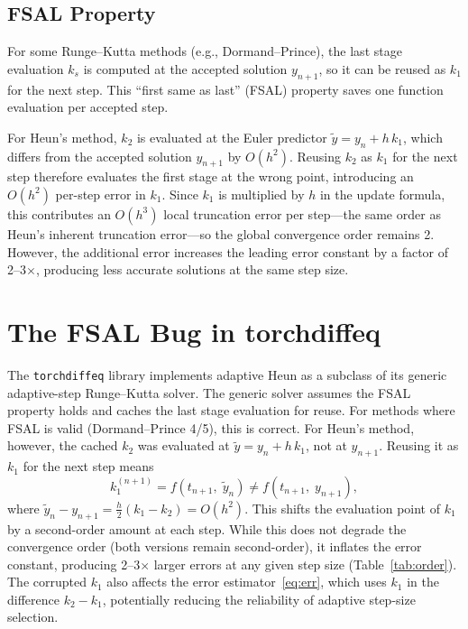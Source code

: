 \documentclass[11pt]{article}
\begin{document}
\subsection{FSAL Property}

For some Runge--Kutta methods (e.g., Dormand--Prince), the last stage
evaluation $k_s$ is computed at the accepted solution $y_{n+1}$, so it
can be reused as $k_1$ for the next step.  This ``first same as last''
(FSAL) property saves one function evaluation per accepted step.

For Heun's method, $k_2$ is evaluated at the Euler predictor
$\tilde{y} = y_n + h\,k_1$, which differs from the accepted solution
$y_{n+1}$ by $O(h^2)$.  Reusing $k_2$ as $k_1$ for the next step
therefore evaluates the first stage at the wrong point, introducing an
$O(h^2)$ per-step error in $k_1$.  Since $k_1$ is multiplied by $h$ in
the update formula, this contributes an $O(h^3)$ local truncation error
per step---the same order as Heun's inherent truncation error---so the
global convergence order remains 2.  However, the additional error
increases the leading error constant by a factor of 2--3$\times$,
producing less accurate solutions at the same step size.

\section{The FSAL Bug in torchdiffeq}
\label{sec:bug}

The \texttt{torchdiffeq} library implements adaptive Heun as a subclass
of its generic adaptive-step Runge--Kutta solver.  The generic solver
assumes the FSAL property holds and caches the last stage evaluation for
reuse.  For methods where FSAL is valid (Dormand--Prince 4/5), this is
correct.  For Heun's method, however, the cached $k_2$ was evaluated
at $\tilde{y} = y_n + h\,k_1$, not at $y_{n+1}$.  Reusing it as
$k_1$ for the next step means
\begin{equation}
  k_1^{(n+1)} = f(t_{n+1},\; \tilde{y}_n) \neq f(t_{n+1},\; y_{n+1}),
  \label{eq:fsal_bug}
\end{equation}
where $\tilde{y}_n - y_{n+1} = \tfrac{h}{2}(k_1 - k_2) = O(h^2)$.
This shifts the evaluation point of $k_1$ by a second-order amount
at each step.  While this does not degrade the convergence order
(both versions remain second-order), it inflates the error constant,
producing 2--3$\times$ larger errors at any given step size
(Table~\ref{tab:order}).  The corrupted $k_1$ also affects the error
estimator~\eqref{eq:err}, which uses $k_1$ in the difference
$k_2 - k_1$, potentially reducing the reliability of adaptive step-size
selection.
\end{document}
